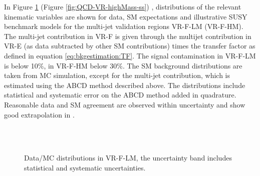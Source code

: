 In Figure \ref{fig:QCD-VR-LowMass-ss} (Figure \ref{fig:QCD-VR-highMass-ss}) ,
distributions of the relevant kinematic variables are shown for data,
SM expectations and illustrative SUSY benchmark models for the
multi-jet validation regions VR-F-LM (VR-F-HM).  The multi-jet contribution in VR-F is given through the multijet contribution in VR-E (as data subtracted by other \ac{SM} contributions) times the transfer factor as defined in equation \eqref{eq:bkgestimation:TF}. The signal contamination in VR-F-LM is below 10\%,  in VR-F-HM below 30\%. The SM background distributions are taken from MC
simulation, except for the multi-jet contribution, which is estimated using the ABCD method
described above. 
The distributions include statistical and systematic error on the ABCD method added in quadrature.
Reasonable data and SM agreement are observed within uncertainty and show good extrapolation in \Mttwomax.

\begin{figure}[!htpb]
\centering
  \\
   \\
  \caption{Data/MC distributions in VR-F-LM, the uncertainty band includes statistical and systematic uncertainties. 
\label{fig:QCD-VR-LowMass-ss}}
\end{figure} %

